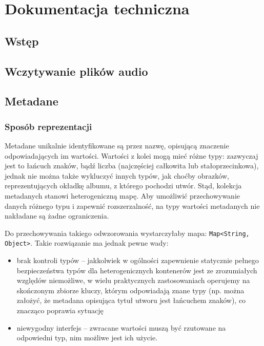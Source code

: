\chapter{Dokumentacja techniczna}

\section{Wstęp}


\section{Wczytywanie plików audio}


\section{Metadane}

\subsection{Sposób reprezentacji}

Metadane unikalnie identyfikowane są przez nazwę, opisującą znaczenie odpowiadających im wartości.
Wartości z kolei mogą mieć różne typy: zazwyczaj jest to łańcuch znaków, bądź liczba (najczęściej
całkowita lub stałoprzecinkowa), jednak nie można także wykluczyć innych typów, jak choćby obrazków,
reprezentujących okładkę albumu, z którego pochodzi utwór. Stąd, kolekcja metadanych stanowi
heterogeniczną mapę. Aby umożliwić przechowywanie danych różnego typu i zapewnić rozszerzalność, na
typy wartości metadanych nie nakładane są żadne ograniczenia.

Do przechowywania takiego odwzorowania wystarczyłaby mapa: \texttt{Map<String, Object>}. Takie
rozwiązanie ma jednak pewne wady:

\begin{itemize}

  \item brak kontroli typów -- jakkolwiek w ogólności zapewnienie statycznie pełnego bezpieczeństwa
typów dla heterogenicznych kontenerów jest ze zrozumiałych względów niemożliwe, w wielu praktycznych
zastosowaniach operujemy na skończonym zbiorze kluczy, którym odpowiadają znane typy (np. można
założyć, że metadana opisująca tytuł utworu jest łańcuchem znaków), co znacząco poprawia sytuację

  \item niewygodny interfejs -- zwracane wartości muszą być rzutowane na odpowiedni typ, nim możliwe
jest ich użycie.

\end{itemize}

